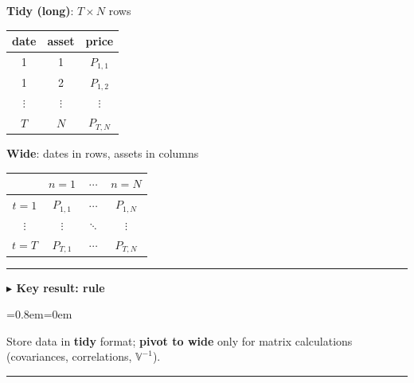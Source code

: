 \documentclass[11pt,a4paper]{report}
\newenvironment{notebox}[1]
  {\par\medskip\Needspace{6\baselineskip}\noindent\rule{\linewidth}{0.4pt}\par\nopagebreak
   \noindent\textbf{#1}\par\nopagebreak
   \begin{list}{}{\leftmargin=0.8em\rightmargin=0em\topsep=2pt}\item[]}
  {\end{list}\nopagebreak\noindent\rule{\linewidth}{0.4pt}\par\medskip}
\newenvironment{keybox}[1][]{\begin{notebox}{$\blacktriangleright$ Key result#1}}{\end{notebox}}
\newcommand{\V}{\mathbb{V}}
\begin{document}
\begin{center}
\begin{minipage}{0.38\textwidth}\centering
\textbf{Tidy (long)}: $T\times N$ rows\\[3pt]
\begin{tabular}{ccc}
\toprule
date & asset & price\\\midrule
1 & 1 & $P_{1,1}$\\
1 & 2 & $P_{1,2}$\\
$\vdots$ & $\vdots$ & $\vdots$\\
$T$ & $N$ & $P_{T,N}$\\\bottomrule
\end{tabular}
\end{minipage}\hfill
\begin{minipage}{0.55\textwidth}\centering
\textbf{Wide}: dates in rows, assets in columns\\[3pt]
\begin{tabular}{cccc}
\toprule
 & $n=1$ & $\cdots$ & $n=N$\\\midrule
$t=1$ & $P_{1,1}$ & $\cdots$ & $P_{1,N}$\\
$\vdots$ & $\vdots$ & $\ddots$ & $\vdots$\\
$t=T$ & $P_{T,1}$ & $\cdots$ & $P_{T,N}$\\\bottomrule
\end{tabular}
\end{minipage}
\end{center}
\begin{keybox}[: rule]
Store data in \textbf{tidy} format; \textbf{pivot to wide} only for matrix
calculations (covariances, correlations, $\V^{-1}$).
\end{keybox}
\end{document}
